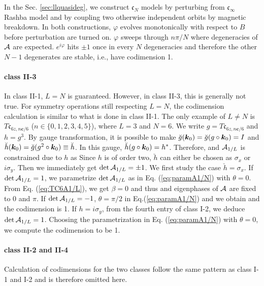 \documentclass[aps, showpacs, twocolumn, notitlepage, superscriptaddress]{revtex4-1}
\begin{document}
In the Sec. \ref{sec:llquasideg}, we construct $\mathfrak{c}_N$ models by perturbing from $\mathfrak{c}_\infty$ Rashba model and by coupling two otherwise independent orbits by magnetic breakdown. In both constructions, $\varphi$ evolves monotonically with respect to $B$ before perturbation are turned on. $\varphi$ sweeps through $n\pi/N$ where degeneracies of ${\cal A}$ are expected. $e^{i\varphi}$ hits $\pm 1$ once in every $N$ degeneracies and therefore the other $N-1$ degenerates are stable, i.e., have codimension 1.

\paragraph*{class II-3} In class II-1, $L=N$ is guaranteed. However, in class II-3, this is generally not true. For symmetry operations still respecting $L=N$, the codimension calculation is similar to what is done in class II-1. The only example of $L\ne N$ is $T\mathfrak{c}_{6z,n\boldsymbol{c}/6}$ ($n\in\{0,1,2,3,4,5\}$), where $L=3$ and $N=6$. We write $g=T\mathfrak{c}_{6z,n\boldsymbol{c}/6}$ and $h=g^3$. By gauge transformation, it is possible to make $\breve{g}(\boldsymbol{k}_0)=\breve{g}(g\circ\boldsymbol{k}_0)=I$ and $\breve{h}(\boldsymbol{k}_0)=\breve{g}(g^2\circ \boldsymbol{k}_0)\equiv\breve{h}$. In this gauge, $\breve{h}(g\circ\boldsymbol{k}_0)=h^*$. Therefore,
and ${\cal A}_{1/L}$ is constrained due to $h$ as 
Since $h$ is of order two, $\breve{h}$ can either be chosen as $\sigma_x$ or $i\sigma_y$. Then we immediately get $\det {\cal A}_{1/L} = \pm 1$. We first study the case $\breve{h}=\sigma_x$. If $\det {\cal A}_{1/L} = 1$, we parametrize $\det {\cal A}_{1/L}$ as in Eq. (\ref{eq:paramA1/N}) with $\theta=0$. From Eq. (\ref{eq:TC6A1/L}), we get $\beta=0$ and thus 
and eigenphases of ${\cal A}$ are fixed to $0$ and $\pi$. If $\det{{\cal A}_{1/L}}=-1$, $\theta=\pi/2$ in Eq.(\ref{eq:paramA1/N}) and we obtain
and the codimension is 1. If $h=i\sigma_y$, from the fourth entry of class I-2, we deduce $\det {\cal A}_{1/L}=1$. Choosing the parametrization in Eq. (\ref{eq:paramA1/N}) with $\theta=0$, we compute the codimension to be 1.

\paragraph*{class II-2 and II-4} Calculation of codimensions for the two classes follow the same pattern as class I-1 and I-2 and is therefore omitted here.
\end{document}
